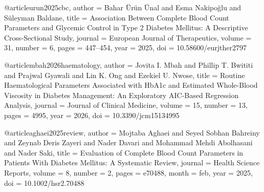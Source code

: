 @article{urun2025cbc,
  author  = {Bahar Ürün Ünal and Esma Nakipoğlu and Süleyman Baldane},
  title   = {Association Between Complete Blood Count Parameters and
             Glycemic Control in Type 2 Diabetes Mellitus:
             A Descriptive Cross-Sectional Study},
  journal = {European Journal of Therapeutics},
  volume  = {31},
  number  = {6},
  pages   = {447--454},
  year    = {2025},
  doi     = {10.58600/eurjther2797}
}

@article{mbah2026haematology,
  author  = {Jovita I. Mbah and Phillip T. Bwititi and
             Prajwal Gyawali and Lin K. Ong and Ezekiel U. Nwose},
  title   = {Routine Haematological Parameters Associated with
             {HbA1c} and Estimated Whole-Blood Viscosity in Diabetes
             Management: An Exploratory {AIC}-Based Regression Analysis},
  journal = {Journal of Clinical Medicine},
  volume  = {15},
  number  = {13},
  pages   = {4995},
  year    = {2026},
  doi     = {10.3390/jcm15134995}
}

@article{aghaei2025review,
  author  = {Mojtaba Aghaei and Seyed Sobhan Bahreiny and
             Zeynab Deris Zayeri and Nader Davari and
             Mohammad Mehdi Abolhasani and Nader Saki},
  title   = {Evaluation of Complete Blood Count Parameters in
             Patients With Diabetes Mellitus: A Systematic Review},
  journal = {Health Science Reports},
  volume  = {8},
  number  = {2},
  pages   = {e70488},
  month   = feb,
  year    = {2025},
  doi     = {10.1002/hsr2.70488}
}